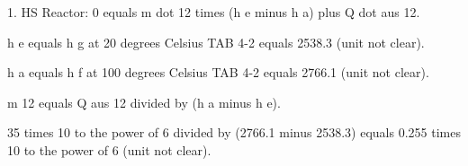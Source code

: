 1. HS Reactor: 0 equals m dot 12 times (h e minus h a) plus Q dot aus 12.

h e equals h g at 20 degrees Celsius TAB 4-2 equals 2538.3 (unit not clear).

h a equals h f at 100 degrees Celsius TAB 4-2 equals 2766.1 (unit not clear).

m 12 equals Q aus 12 divided by (h a minus h e).

35 times 10 to the power of 6 divided by (2766.1 minus 2538.3) equals 0.255 times 10 to the power of 6 (unit not clear).